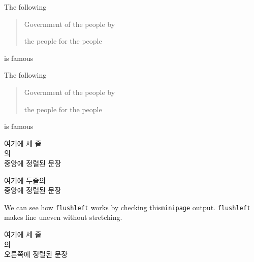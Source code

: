\documentclass[11pt]{article}
\begin{document}
The following 
\begin{quote}
Government of the people by

the people for the people
\end{quote}
is famous

The following
\begin{quotation}
Government of the people by

the people for the people
\end{quotation}
is famous

\begin{center}
여기에 세 줄 \\ 의 \\
중앙에 정렬된 문장
\end{center}

\centerline{ 여기에 두줄의\\ 중앙에 정렬된 문장}

\begin{flushleft}
We can see how \texttt{flushleft} works by checking this\texttt{minipage} output. \texttt{flushleft} makes line uneven without stretching.
\end{flushleft}

\begin{flushright}
여기에 세 줄 \\ 의\\ 오른쪽에 정렬된 문장
\end{flushright}
\end{document}
